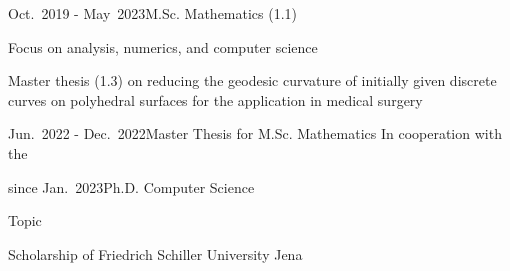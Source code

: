\documentclass[a4paper,10pt]{cv}
\begin{document}
      \begin{cvTimeItem}{Oct.~2019 - May~2023}{M.Sc. Mathematics (1.1)}
        \begin{cvItemize}
          \item Focus on analysis, numerics, and computer science
          \item Master thesis  (1.3) on reducing the geodesic curvature of initially given discrete curves on polyhedral surfaces for the application in medical surgery
        \end{cvItemize}
      \end{cvTimeItem}

      \begin{cvTimeItem}{Jun.~2022 - Dec.~2022}{Master Thesis for M.Sc. Mathematics}
          In cooperation with the 
      \end{cvTimeItem}

      \begin{cvTimeItem}{since Jan.~2023}{Ph.D. Computer Science}
        \begin{cvItemize}
          \item Topic 
          \item Scholarship  of Friedrich Schiller University Jena
        \end{cvItemize}
      \end{cvTimeItem}
\end{document}
